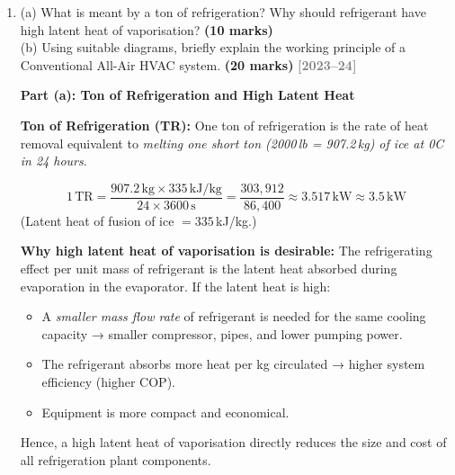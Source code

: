 \documentclass[12pt,a3paper]{article}
\newcommand{\yr}[1]{\hfill\textcolor{gray}{\small\textbf{[#1]}}}
\newcommand{\mk}[1]{\textcolor{orange!70!black}{\small\textbf{(#1 marks)}}}
\begin{document}
\begin{enumerate}
\begin{tcolorbox}[enhanced,breakable,ansbox,colback=cC!4,colframe=cC,
  boxrule=0.8pt,arc=5pt,
  title={\textbf{Solution}},fonttitle=\bfseries\color{white},colbacktitle=cC]
\medskip
\textbf{(iii) COP:}
\[
  \mathrm{COP} = \frac{h_1 - h_4}{h_2 - h_1}
  = \frac{229.02 - 85.26}{276.26 - 229.02}
  = \frac{143.76}{47.24}
  \quad\boxed{\mathrm{COP} \approx 3.04}
\]

\end{tcolorbox}



\item \label{qlabel:A3-Q4}
(a) What is meant by a ton of refrigeration? Why should refrigerant have high latent heat of vaporisation? \mk{10}\\
(b) Using suitable diagrams, briefly explain the working principle of a Conventional All-Air HVAC system. \mk{20}
\yr{2023--24}



\begin{tcolorbox}[enhanced,breakable,ansbox,colback=cC!4,colframe=cC,
  boxrule=0.8pt,arc=5pt,
  title={\textbf{Answer}},fonttitle=\bfseries\color{white},colbacktitle=cC]

\textbf{Part (a): Ton of Refrigeration and High Latent Heat}

\textbf{Ton of Refrigeration (TR):}
One ton of refrigeration is the rate of heat removal equivalent to
\emph{melting one short ton (2000\,lb = 907.2\,kg) of ice at 0\textdegree C
in 24 hours}.

\[
  1\,\text{TR} = \frac{907.2\,\text{kg}\times335\,\text{kJ/kg}}
                      {24\times3600\,\text{s}}
  = \frac{303{,}912}{86{,}400} \approx 3.517\,\text{kW}
  \approx \boxed{3.5\,\text{kW}}
\]
(Latent heat of fusion of ice $= 335$\,kJ/kg.)

\textbf{Why high latent heat of vaporisation is desirable:}
The refrigerating effect per unit mass of refrigerant is the latent heat
absorbed during evaporation in the evaporator. If the latent heat is high:
\begin{itemize}[leftmargin=1.5em,itemsep=1pt]
  \item A \emph{smaller mass flow rate} of refrigerant is needed for the
        same cooling capacity → smaller compressor, pipes, and lower pumping
        power.
  \item The refrigerant absorbs more heat per kg circulated → higher system
        efficiency (higher COP).
  \item Equipment is more compact and economical.
\end{itemize}
Hence, a high latent heat of vaporisation directly reduces the size and cost
of all refrigeration plant components.


\end{tcolorbox}
\end{enumerate}
\end{document}
